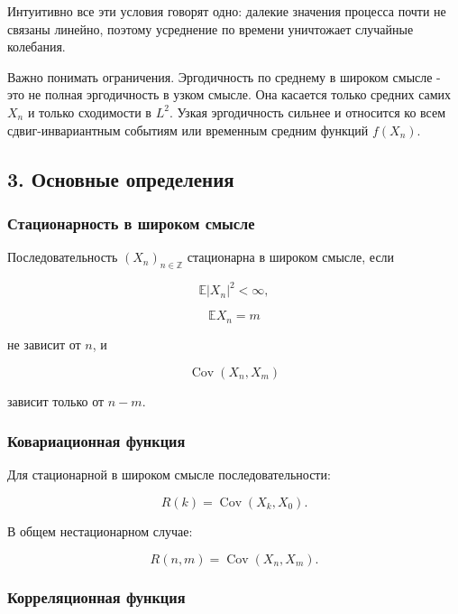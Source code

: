 \documentclass[
  11pt,
  a4paper,
]{article}
\begin{document}
Интуитивно все эти условия говорят одно: далекие значения процесса почти
не связаны линейно, поэтому усреднение по времени уничтожает случайные
колебания.

Важно понимать ограничения. Эргодичность по среднему в широком смысле -
это не полная эргодичность в узком смысле. Она касается только средних
самих \(X_n\) и только сходимости в \(L^2\). Узкая эргодичность сильнее
и относится ко всем сдвиг-инвариантным событиям или временным средним
функций \(f(X_n)\).

\subsection{3. Основные
определения}\label{ux43eux441ux43dux43eux432ux43dux44bux435-ux43eux43fux440ux435ux434ux435ux43bux435ux43dux438ux44f}

\subsubsection{Стационарность в широком
смысле}\label{ux441ux442ux430ux446ux438ux43eux43dux430ux440ux43dux43eux441ux442ux44c-ux432-ux448ux438ux440ux43eux43aux43eux43c-ux441ux43cux44bux441ux43bux435}

Последовательность \((X_n)_{n\in\mathbb Z}\) стационарна в широком
смысле, если

\[
\mathbb E|X_n|^2<\infty,
\]

\[
\mathbb EX_n=m
\]

не зависит от \(n\), и

\[
\operatorname{Cov}(X_n,X_m)
\]

зависит только от \(n-m\).

\subsubsection{Ковариационная
функция}\label{ux43aux43eux432ux430ux440ux438ux430ux446ux438ux43eux43dux43dux430ux44f-ux444ux443ux43dux43aux446ux438ux44f}

Для стационарной в широком смысле последовательности:

\[
R(k)=\operatorname{Cov}(X_k,X_0).
\]

В общем нестационарном случае:

\[
R(n,m)=\operatorname{Cov}(X_n,X_m).
\]

\subsubsection{Корреляционная
функция}\label{ux43aux43eux440ux440ux435ux43bux44fux446ux438ux43eux43dux43dux430ux44f-ux444ux443ux43dux43aux446ux438ux44f}
\end{document}

